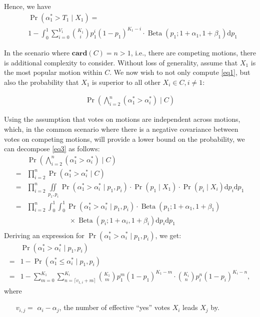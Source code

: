 \documentclass{sigchi}
\begin{document}
Hence, we have
\begin{align}\label{eq2}
& \Pr(\alpha^*_1 > T_1 \mid X_1) = \nonumber\\
& 1 - \int_0^1 \sum\limits_{i=0}^{V_1} {K_1 \choose i} p_1^{i} {(1-p_1)}^{K_1-i} \cdot \operatorname{Beta}(p_1; 1+\alpha_1,1+\beta_1) \mathrm{d}p_1
\end{align}

In the scenario where $\mathbf{card}(C) = n > 1$, i.e., there are competing motions, there is additional complexity to
consider.
Without loss of generality, assume that $X_1$ is the most popular motion within $C$.
We now wish to not only compute \eqref{eq1}, but also the probability that $X_1$ is superior to all other
$X_i  \in C, i \neq 1$:

\begin{align}\label{eq3}
\Pr\left(\bigwedge_{i=2}^n (\alpha^*_1 > \alpha^*_i) \mid C\right)
\end{align}

Using the assumption
that votes on motions are independent across motions, which, in the common
scenario where there is a negative covariance between votes on competing
motions, will provide a lower bound on the probability, we can decompose \eqref{eq3} as follows:
\begin{align*}
& \Pr\left(\bigwedge_{i=2}^n (\alpha^*_1 > \alpha^*_i) \mid C\right)\\
=& \prod_{i=2}^n \Pr(\alpha^*_1 > \alpha^*_i \mid C)\\
=& \prod_{i=2}^n \iint\limits_{p_1, p_i} \Pr(\alpha^*_1 > \alpha^*_i \mid p_1, p_i) \cdot \Pr(p_1 \mid X_1) \cdot \Pr(p_i \mid X_i) \mathrm{d}p_i \mathrm{d}p_1\\
=& \prod_{i=2}^n \int_0^1 \int_0^1 \Pr(\alpha^*_1 > \alpha^*_i \mid p_1, p_i) \cdot \operatorname{Beta}(p_1; 1+\alpha_1,1+\beta_1) \\
& \qquad\qquad\qquad \times \operatorname{Beta}(p_i; 1+\alpha_i,1+\beta_i) \mathrm{d}p_i \mathrm{d}p_1\\
\end{align*}
Deriving an expression for $\Pr(\alpha^*_1 > \alpha^*_i \mid p_1, p_i)$, we get:
\begin{align*}
& \Pr(\alpha^*_1 > \alpha^*_i \mid p_1, p_i)\\
=& 1 - \Pr(\alpha^*_1 \leq \alpha^*_i \mid p_1, p_i)\\
=& 1 - \sum\limits_{m=0}^{K_1} \sum\limits_{n=\lceil{v_{1,i}+m}\rceil}^{K_i} {K_1 \choose m} p_1^{m} {(1-p_1)}^{K_1 - m} \cdot {K_i \choose n} p_i^{n} {(1-p_i)}^{K_i-n},
\end{align*}
where
\begin{description}
\begin{itemize}
\item[$v_{i,j} = $] $\alpha_i - \alpha_j$, the number of effective ``yes'' votes $X_i$ leads $X_j$ by.
\end{itemize}
\end{description}
\end{document}
